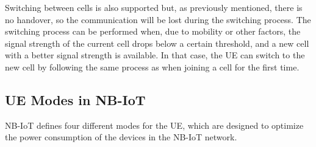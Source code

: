 Switching between cells is also supported but, as previously mentioned, there is no handover, so the communication will be lost during the switching process. The switching process can be performed when, due to mobility or other factors, the signal strength of the current cell drops below a certain threshold, and a new cell with a better signal strength is available. In that case, the UE can switch to the new cell by following the same process as when joining a cell for the first time.

\subsection{UE Modes in NB-IoT}

NB-IoT defines four different modes for the UE, which are designed to optimize the power consumption of the devices in the NB-IoT network.

